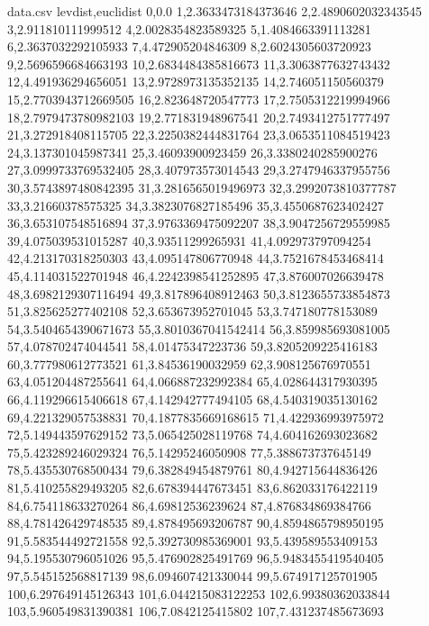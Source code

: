 \documentclass[11pt]{article}
\begin{document}
\begin{filecontents*}{data.csv}
  levdist,euclidist
  0,0.0
  1,2.3633473184373646
  2,2.4890602032343545
  3,2.911810111999512
  4,2.0028354823589325
  5,1.4084663391113281
  6,2.3637032292105933
  7,4.472905204846309
  8,2.6024305603720923
  9,2.5696596684663193
  10,2.6834484385816673
  11,3.3063877632743432
  12,4.491936294656051
  13,2.9728973135352135
  14,2.746051150560379
  15,2.7703943712669505
  16,2.823648720547773
  17,2.7505312219994966
  18,2.7979473780982103
  19,2.771831948967541
  20,2.7493412751777497
  21,3.272918408115705
  22,3.2250382444831764
  23,3.0653511084519423
  24,3.137301045987341
  25,3.46093900923459
  26,3.3380240285900276
  27,3.0999733769532405
  28,3.407973573014543
  29,3.2747946337955756
  30,3.5743897480842395
  31,3.2816565019496973
  32,3.2992073810377787
  33,3.21660378575325
  34,3.3823076827185496
  35,3.4550687623402427
  36,3.653107548516894
  37,3.9763369475092207
  38,3.9047256729559985
  39,4.075039531015287
  40,3.93511299265931
  41,4.092973797094254
  42,4.213170318250303
  43,4.095147806770948
  44,3.7521678453468414
  45,4.114031522701948
  46,4.2242398541252895
  47,3.876007026639478
  48,3.6982129307116494
  49,3.817896408912463
  50,3.8123655733854873
  51,3.825625277402108
  52,3.653673952701045
  53,3.747180778153089
  54,3.5404654390671673
  55,3.8010367041542414
  56,3.859985693081005
  57,4.078702474044541
  58,4.01475347223736
  59,3.8205209225416183
  60,3.777980612773521
  61,3.84536190032959
  62,3.908125676970551
  63,4.051204487255641
  64,4.066887232992384
  65,4.028644317930395
  66,4.119296615406618
  67,4.142942777494105
  68,4.540319035130162
  69,4.221329057538831
  70,4.1877835669168615
  71,4.422936993975972
  72,5.149443597629152
  73,5.065425028119768
  74,4.604162693023682
  75,5.423289246029324
  76,5.14295246050908
  77,5.388673737645149
  78,5.435530768500434
  79,6.382849454879761
  80,4.942715644836426
  81,5.410255829493205
  82,6.678394447673451
  83,6.862033176422119
  84,6.754118633270264
  86,4.69812536239624
  87,4.876834869384766
  88,4.781426429748535
  89,4.878495693206787
  90,4.8594865798950195
  91,5.583544492721558
  92,5.392730985369001
  93,5.439589553409153
  94,5.195530796051026
  95,5.476902825491769
  96,5.9483455419540405
  97,5.545152568817139
  98,6.094607421330044
  99,5.674917125701905
  100,6.297649145126343
  101,6.044215083122253
  102,6.99380362033844
  103,5.960549831390381
  106,7.0842125415802
  107,7.431237485673693
\end{filecontents*}
\end{document}
